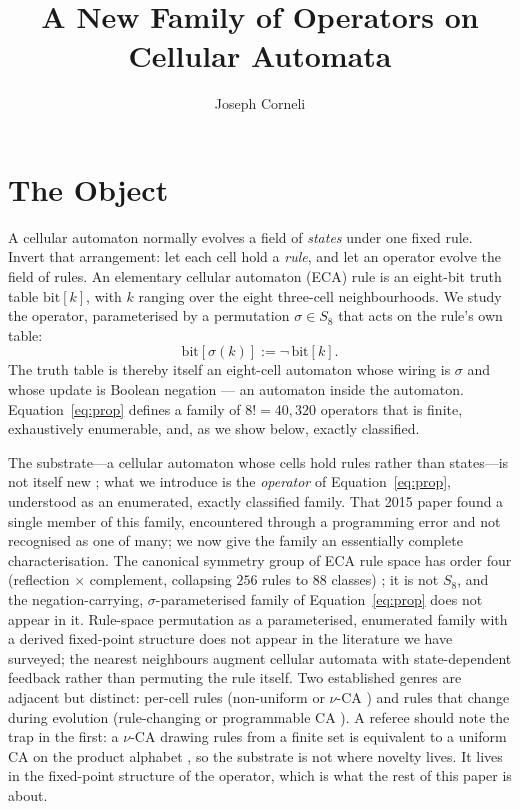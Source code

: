 \documentclass[man,12pt,floatsintext]{apa7}
\title{A New Family of Operators on Cellular Automata}
\author{Joseph Corneli}
\affiliation{}
\newcommand{\sig}{\sigma}
\newcommand{\bit}[1]{\mathrm{bit}[#1]}
\begin{document}
\maketitle

\section{The Object}
\label{sec:object}

A cellular automaton normally evolves a field of \emph{states} under one
fixed rule. Invert that arrangement: let each cell hold a \emph{rule}, and
let an operator evolve the field of rules. An elementary cellular automaton
(ECA) rule is an eight-bit truth table $\bit{k}$, with $k$ ranging over the
eight three-cell neighbourhoods. We study the operator, parameterised by a
permutation $\sig \in S_8$ that acts on the rule's own table:
\begin{equation}
\bit{\sig(k)} := \lnot\,\bit{k}.
\label{eq:prop}
\end{equation}
The truth table is thereby itself an eight-cell automaton whose wiring is
$\sig$ and whose update is Boolean negation --- an automaton inside the
automaton. Equation~\eqref{eq:prop} defines a family of $8! = 40{,}320$
operators that is finite, exhaustively enumerable, and, as we show below,
exactly classified.

The substrate---a cellular automaton whose cells hold rules rather than
states---is not itself new \parencite{corneli2015search}; what we introduce
is the \emph{operator} of Equation~\eqref{eq:prop}, understood as an
enumerated, exactly classified family. That 2015 paper found a single
member of this family, encountered through a programming error and not
recognised as one of many; we now give the family an essentially complete
characterisation. The canonical symmetry group of ECA
rule space has order four (reflection $\times$ complement, collapsing $256$
rules to $88$ classes) \parencite{svozil2025symmetries}; it is not $S_8$,
and the negation-carrying, $\sig$-parameterised family of
Equation~\eqref{eq:prop} does not appear in it. Rule-space permutation as a
parameterised, enumerated family with a derived fixed-point structure does
not appear in the literature we have surveyed; the nearest neighbours
augment cellular automata with state-dependent feedback
\parencite{pavlic2014selfref} rather than permuting the rule itself. Two
established genres are adjacent but distinct: per-cell rules (non-uniform or
$\nu$-CA \parencite{dennunzio2011nonuniform}) and rules that change during
evolution (rule-changing or programmable CA
\parencite{mori1998rulechanging}). A
referee should note the trap in the first: a $\nu$-CA drawing rules from a
finite set is equivalent to a uniform CA on the product alphabet
\parencite{dennunzio2011nonuniform}, so the substrate is not where novelty
lives. It lives in the fixed-point structure of the operator, which is what
the rest of this paper is about.
\end{document}
